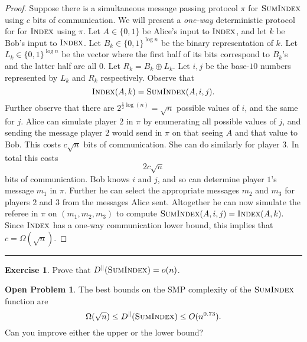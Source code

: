 \documentclass[11pt]{amsart}
\theoremstyle{plain}
\theoremstyle{definition}
\newtheorem{exercise}{Exercise}
\newtheorem{open}{Open Problem}
\theoremstyle{plain}
\newcommand{\Index}{\textsc{Index}}
\newcommand{\SumIndex}{\textsc{SumIndex}}
\newcommand{\exercises}{\bigskip \noindent\rule{8cm}{0.4pt} \medskip}
\begin{document}
\begin{proof}
Suppose there is a simultaneous message passing protocol $\pi$ for $\SumIndex$ using $c$ bits of communication. We will present a \emph{one-way} deterministic protocol for for $\Index$ using $\pi$. Let $A \in \{0,1\}$ be Alice's input to $\Index$, and let $k$ be Bob's input to $\Index$. Let $B_k \in \{0,1\}^{\log n}$ be the binary representation of $k$. Let $L_k\in \{0,1\}^{\log n}$ be the vector where the first half of its bits correspond to $B_k$'s and the latter half are all $0$. Let $R_k = B_k \oplus L_k$. Let $i, j$ be the base-$10$ numbers represented by $L_k$ and $R_k$ respectively. Observe that
$$\Index(A,k) = \SumIndex(A,i,j).$$
Further observe that there are $2^{\frac{1}{2}\log(n)} = \sqrt{n}$ possible values of $i$, and the same for $j$. Alice can simulate player $2$ in $\pi$ by enumerating all possible values of $j$, and sending the message player $2$ would send in $\pi$ on that seeing $A$ and that value to Bob. This costs $c\sqrt{n}$ bits of communication. She can do similarly for player $3$. In total this costs
$$2c\sqrt{n}$$
bits of communication. Bob knows $i$ and $j$, and so can determine player $1$'s message $m_1$ in $\pi$. Further he can select the appropriate messages $m_2$ and $m_3$ for players $2$ and $3$ from the messages Alice sent. Altogether he can now simulate the referee in $\pi$ on $(m_1,m_2,m_3)$ to compute $\SumIndex(A,i,j) = \Index(A,k).$ Since $\Index$ has a one-way communication lower bound, this implies that $c = \Omega(\sqrt{n})$.
\end{proof}

\exercises

\begin{exercise}
Prove that $D^\parallel(\SumIndex) = o(n)$.
\end{exercise}

\begin{open}
The best bounds on the SMP complexity of the $\SumIndex$ function are
\[
\Omega(\sqrt{n}) \le D^\parallel(\SumIndex) \le O(n^{0.73}).
\]
Can you improve either the upper or the lower bound?
\end{open}
\end{document}
